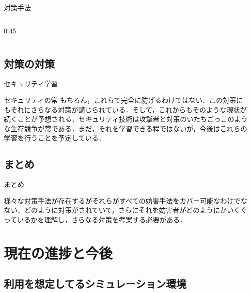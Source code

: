 \documentclass[11pt, aspectratio=169]{beamer}
\begin{document}
\begin{frame}{対策手法}
\begin{columns}[c]
\begin{column}{0.45\textwidth}
    \end{column}
    
  \end{columns}
\end{frame}

\subsection{対策の対策}

\begin{frame}{セキュリティ学習}
  \begin{block}{セキュリティの常}
    もちろん，これらで完全に防げるわけではない．この対策にもそれにさらなる対策が講じられている．そして，これからもそのような現状が続くことが予想される．セキュリティ技術は攻撃者と対策のいたちごっこのような生存競争が常である．まだ，それを学習できる程ではないが，今後はこれらの学習を行うことを予定している．
  \end{block}
\end{frame}

\subsection{まとめ}

\begin{frame}{まとめ}
  \begin{block}{}
    様々な対策手法が存在するがそれらがすべての妨害手法をカバー可能なわけでなない．どのように対策がされていて，さらにそれを妨害者がどのようにかいくぐっているかを理解し，さらなる対策を考案する必要がある．
  \end{block}
\end{frame}

\section{現在の進捗と今後}

\subsection{利用を想定してるシミュレーション環境}
\end{document}
